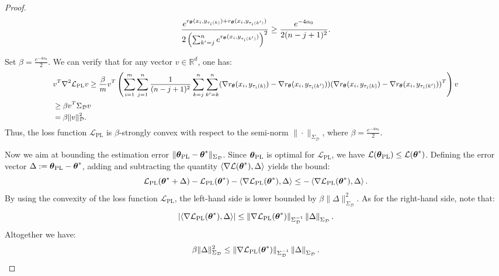 \begin{proof}
\begin{equation*}
\frac{e^{r_{{\boldsymbol{\theta}}}(x_{i},y_{\tau_{i}(k)})+r_{{\boldsymbol{\theta}}} (x_{i},y_{\tau_{i}(k')})}}{2\left(\sum_{k'=j}^{n}e^{r_{{\boldsymbol{\theta}}} (x_{i},y_{\tau_{i}(k')})}\right)^{2}}\geq\frac{e^{-4\alpha_{0}}}{2(n-j+1)^{2}}.
\end{equation*}

Set $\beta = \frac{e^{-4\alpha_{0}}}{2}$. We can verify that for any vector $v\in\mathbb{R}^{d}$, one has:
\begin{equation*}
\fontsize{9}{3}\selectfont{
\begin{aligned}
& v^{T}\nabla^{2} \mathcal{L}_{\text{PL}}v \geq\frac{\beta}{m}v^{T}\left(\sum_{i=1}^{m}\sum_{j=1}^{n}\frac{1}{(n-j+1)^{2}}\sum_{k=j}^{n}\sum_{k'=k}^{n}(\nabla r_{\wm}(x_{i},y_{\tau_{i}(k)})-\nabla r_{\wm}(x_{i},y_{\tau_{i}(k')}))(\nabla r_{\wm}(x_{i},y_{\tau_{i}(k)})-\nabla r_{\wm}(x_{i},y_{\tau_{i}(k')}))^{T}\right)v \\
& \geq \beta v^{T}\Sigma_{\mathcal{D}}v \\
& =\beta \|v\|^{2}_{\mathcal{D}}.
\end{aligned}}
\end{equation*}
Thus, the loss function $\mathcal{L}_{\text{PL}}$ is $\beta$-strongly convex with respect to the semi-norm $\|\cdot\|_{\Sigma_{\mathcal{D}}}$, where $\beta = \frac{e^{-4\alpha_{0}}}{2}$.

Now we aim at bounding the estimation error $\|\boldsymbol{\theta}_{\text{\text{PL}}}-{\boldsymbol{\theta}}^{*}\|_{{\Sigma}_{\mathcal{D}}}$. Since $\boldsymbol{\theta}_{\text{\text{PL}}}$ is optimal for $\mathcal{L}_{\text{PL}}$, we have $\mathcal{L}(\boldsymbol{\theta}_{\text{\text{PL}}})\leq\mathcal{L}({\boldsymbol{\theta}}^{*})$. Defining the error vector $\Delta:=\boldsymbol{\theta}_{\text{\text{PL}}}-{\boldsymbol{\theta}}^{*}$, adding and subtracting the quantity $\left\langle\nabla\mathcal{L}({\boldsymbol{\theta}}^{*}), \Delta\right\rangle $ yields the bound:
\begin{equation*}
\mathcal{L}_{\text{PL}}({\boldsymbol{\theta}}^{*}+\Delta)-\mathcal{L}_{\text{PL}}({\boldsymbol{\theta}}^{*})-\left\langle\nabla\mathcal{L}_{\text{PL}}({\boldsymbol{\theta}}^{*}), \Delta\right\rangle \leq -\left\langle\nabla\mathcal{L}_{\text{PL}}({\boldsymbol{\theta}}^{*}), \Delta\right\rangle.
\end{equation*}
By using the convexity of the loss function $\mathcal{L}_{\text{PL}}$, the left-hand side is lower bounded by $\beta\|\Delta\|^{2}_{\Sigma_{\mathcal{D}}}$.
As for the right-hand side, note that:
\begin{equation*}\left|\left\langle\nabla\mathcal{L}_{\text{PL}}({\boldsymbol{\theta}}^{*}), \Delta\right\rangle\right|\leq\left\|\nabla\mathcal{L}_{\text{PL}}({\boldsymbol{\theta}}^{*})\right\|_{{\Sigma}^{-1}_{\mathcal{D}}}\left\|\Delta\right\|_{{\Sigma}_{\mathcal{D}}}.
\end{equation*}
Altogether we have:
\begin{equation*}
\beta\|\Delta\|^{2}_{\Sigma_{\mathcal{D}}}\leq \left\|\nabla\mathcal{L}_{\text{PL}}({\boldsymbol{\theta}}^{*})\right\|_{{\Sigma}^{-1}_{\mathcal{D}}}\left\|\Delta\right\|_{{\Sigma}_{\mathcal{D}}}.
\end{equation*}



\end{proof}
